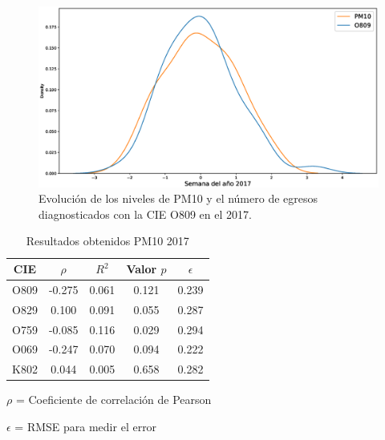 \begin{figure}[h!]
\setcounter{figure}{0} %
\captionsetup{type=figure} %
\begin{center}
   \includegraphics[width=1\textwidth]{PM10_O809_2017.eps}
   \end{center}
    \caption[Series de tiempo 2017 PM10 y O809]{Evolución de los niveles de PM10 y el número de egresos diagnosticados con la CIE O809 en el 2017.}
    \label{serie_de_tiempo_2017_PM10}
\end{figure}

\begin{table}[hbt!]
\centering
\caption{Resultados obtenidos PM10 2017}
\label{tab:Resultados obtenidos PM10 2017}
\vspace{0.5cm}
\begin{threeparttable}
\begin{tabular}{|c|c|c|c|c|}
	\hline
	CIE & $\rho$ & $R^2$ & Valor $p$ & $\epsilon$\\
	\hline
	O809 & -0.275 & 0.061 & 0.121 & 0.239 \\
	\hline
	O829 & 0.100 & 0.091 & 0.055 & 0.287 \\
	\hline
	O759 & -0.085 & 0.116 & 0.029 & 0.294 \\
	\hline
	O069 & -0.247 & 0.070 & 0.094 & 0.222 \\
	\hline
	K802 & 0.044 & 0.005 & 0.658 & 0.282 \\
	\hline
\end{tabular}
\begin{tablenotes}
\footnotesize
\item{$\rho$ = Coeficiente de correlación de Pearson}
\item{$\epsilon$ = RMSE para medir el error}
\end{tablenotes}
\end{threeparttable}
\end{table}

